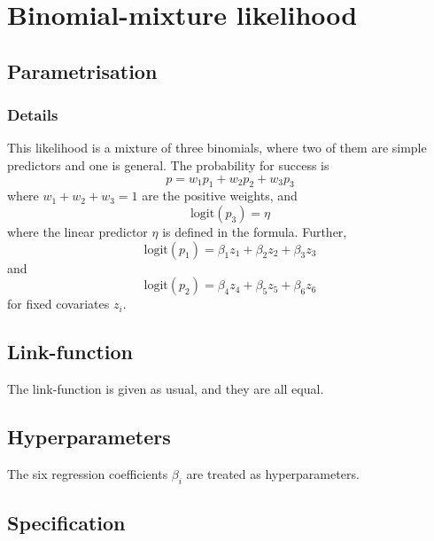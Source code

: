\documentclass[a4paper,11pt]{article}
\begin{document}
\section*{Binomial-mixture likelihood}

\subsection*{Parametrisation}

\subsubsection*{Details}

This likelihood is a mixture of three binomials, where two of them are
simple predictors and one is general. The probability for success is
\begin{displaymath}
    p = w_1 p_1 + w_2 p_2 + w_3 p_3
\end{displaymath}
where $w_1 + w_2 + w_3 = 1$ are the positive weights, and
\begin{displaymath}
    \text{logit}(p_3) = \eta
\end{displaymath}
where the linear predictor $\eta$ is defined in the formula. Further,
\begin{displaymath}
    \text{logit}(p_1) = \beta_{1} z_{1} + \beta_{2} z_{2} +
    \beta_{3} z_{3}
\end{displaymath}
and
\begin{displaymath}
    \text{logit}(p_2) = \beta_{4} z_{4} + \beta_{5} z_{5} +
    \beta_{6} z_{6}
\end{displaymath}
for fixed covariates $z_{i}$. 

\subsection*{Link-function}

The link-function is given as usual, and they are all equal.

\subsection*{Hyperparameters}

The six regression coefficients $\beta_{i}$ are treated as
hyperparameters. 

\subsection*{Specification}
\end{document}
